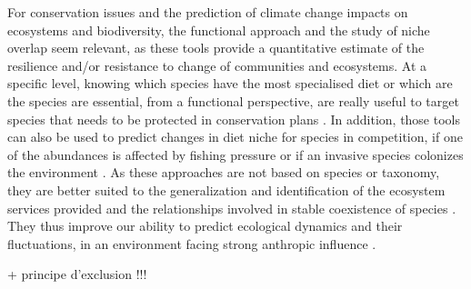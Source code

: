 For conservation issues and the prediction of climate change impacts on ecosystems and biodiversity, the functional approach and the study of niche overlap seem relevant, as these tools provide a quantitative estimate of the resilience and/or resistance to change of communities and ecosystems. 
 At a specific level, knowing which species have the most specialised diet or which are the species are essential, from a functional perspective, are really useful to target species that needs to be protected in conservation plans \citep{cooke2020,mejri2009,norton1995}. In addition, those tools can also be used to predict changes in diet niche for species in competition, if one of the abundances is affected by fishing pressure \citep{diderich2006} or if an invasive species colonizes the environment \citep{albouy2011,geange2011,nagelkerke2018}. As these approaches are not based on species or taxonomy, they are better suited to the generalization and identification of the ecosystem services provided \citep{martini2020,mcgill2006} and the relationships involved in stable coexistence of species \citep{albouy2011}. They thus improve our ability to predict ecological dynamics and their fluctuations, in an environment facing strong anthropic influence \citep{kremer2017}. 

+ principe d'exclusion !!!